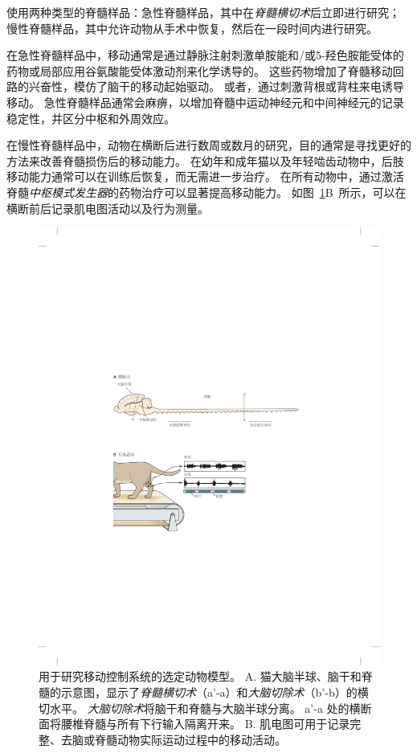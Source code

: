 \begin{proposition}[用于研究移动神经元控制的样品]
	\quad \quad 使用两种类型的脊髓样品：急性脊髓样品，其中在\textit{脊髓横切术}后立即进行研究；
	慢性脊髓样品，其中允许动物从手术中恢复，然后在一段时间内进行研究。
	
	\quad \quad 在急性脊髓样品中，移动通常是通过静脉注射刺激单胺能和/或5-羟色胺能受体的药物或局部应用谷氨酸能受体激动剂来化学诱导的。
	这些药物增加了脊髓移动回路的兴奋性，模仿了脑干的移动起始驱动。
	或者，通过刺激背根或背柱来电诱导移动。
	急性脊髓样品通常会麻痹，以增加脊髓中运动神经元和中间神经元的记录稳定性，并区分中枢和外周效应。
	
	\quad \quad 在慢性脊髓样品中，动物在横断后进行数周或数月的研究，目的通常是寻找更好的方法来改善脊髓损伤后的移动能力。
	在幼年和成年猫以及年轻啮齿动物中，后肢移动能力通常可以在训练后恢复，而无需进一步治疗。
	在所有动物中，通过激活脊髓\textit{中枢模式发生器}的药物治疗可以显著提高移动能力。
	如图~\ref{fig:33_2}B~所示，可以在横断前后记录肌电图活动以及行为测量。
	
\end{proposition}


\begin{figure}[htbp]
	\centering
	\includegraphics[width=0.89\linewidth]{chap33/fig_33_2}
	\caption{用于研究移动控制系统的选定动物模型。
	A. 猫大脑半球、脑干和脊髓的示意图，显示了\textit{脊髓横切术}（a'-a）和\textit{大脑切除术}（b'-b）的横切水平。
	\textit{大脑切除术}将脑干和脊髓与大脑半球分离。
	a'-a 处的横断面将腰椎脊髓与所有下行输入隔离开来。
	B. 肌电图可用于记录完整、去脑或脊髓动物实际运动过程中的移动活动。}
	\label{fig:33_2}
\end{figure}


